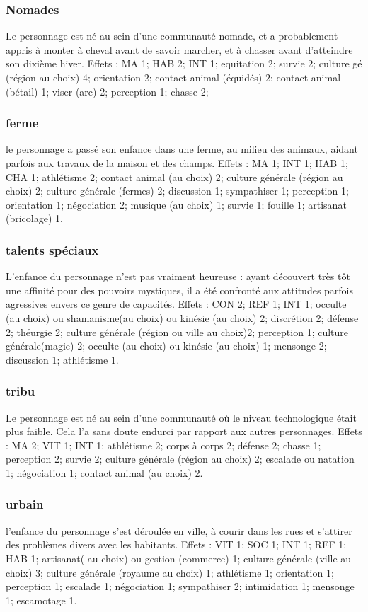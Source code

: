 \documentclass[10pt,a4paper,twocolumn]{book}
\begin{document}
\subsubsection{Nomades}
Le personnage est né au sein d’une communauté nomade, et a probablement appris à monter à cheval avant de savoir marcher, et à chasser avant d’atteindre son dixième hiver.
Effets : MA 1; HAB 2; INT 1; equitation 2; survie 2; culture gé (région au choix) 4; orientation 2; contact animal (équidés) 2; contact animal (bétail) 1; viser (arc) 2; perception 1; chasse 2;
\subsubsection{ferme}
le personnage a passé son enfance dans une ferme, au milieu des animaux, aidant parfois aux travaux de la maison et des champs.
Effets : MA 1; INT 1; HAB 1; CHA 1; athlétisme 2; contact animal (au choix) 2;  culture générale (région au choix) 2; culture générale (fermes) 2; discussion 1; sympathiser 1; perception 1; orientation 1; négociation 2; musique (au choix) 1; survie 1; fouille 1; artisanat (bricolage) 1.
\subsubsection{talents spéciaux}
L’enfance du personnage n’est pas vraiment heureuse : ayant découvert très tôt une affinité pour des pouvoirs mystiques, il a été confronté aux attitudes parfois agressives envers ce genre de capacités.
Effets : CON 2; REF 1; INT 1; occulte (au choix) ou shamanisme(au choix) ou kinésie (au choix) 2; discrétion 2; défense 2; théurgie 2; culture générale (région ou ville au choix)2; perception 1; culture générale(magie) 2; occulte (au choix) ou kinésie (au choix) 1; mensonge 2; discussion 1; athlétisme 1.
\subsubsection{tribu}
Le personnage est né au sein d’une communauté où le niveau technologique était plus faible. Cela l’a sans doute endurci par rapport aux autres personnages.
Effets : MA 2; VIT 1; INT 1; athlétisme 2; corps à corps 2; défense 2; chasse 1; perception 2; survie 2; culture générale (région au choix) 2; escalade ou natation 1; négociation 1; contact animal (au choix) 2.
\subsubsection{urbain}
l’enfance du personnage s’est déroulée en ville, à courir dans les rues et s’attirer des problèmes divers avec les habitants.
Effets : VIT 1; SOC 1; INT 1; REF 1; HAB 1; artisanat( au choix) ou gestion (commerce) 1; culture générale (ville au choix) 3; culture générale (royaume au choix) 1; athlétisme 1; orientation 1; perception 1; escalade 1; négociation 1; sympathiser 2; intimidation 1; mensonge 1; escamotage 1.
\end{document}
